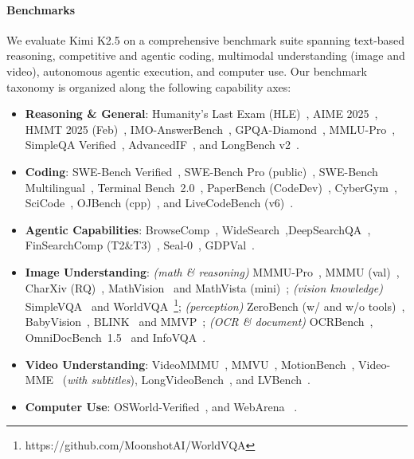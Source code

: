 \paragraph{Benchmarks}
We evaluate Kimi K2.5 on a comprehensive benchmark suite spanning text-based reasoning, competitive and agentic coding, multimodal understanding (image and video), autonomous agentic execution, and computer use. Our benchmark taxonomy is organized along the following capability axes:
\begin{itemize}
\item \textbf{Reasoning \& General}: Humanity's Last Exam (HLE)~\citep{phan2025humanitysexam}, AIME 2025~\citep{aime2025}, HMMT 2025 (Feb)~\citep{hmmt2025feb}, IMO-AnswerBench~\citep{luong-etal-2025-towards}, GPQA-Diamond~\citep{rein2024gpqa}, MMLU-Pro~\citep{wang2024mmluprorobustchallengingmultitask}, SimpleQA Verified~\citep{haas2025simpleqaverifiedreliablefactuality}, AdvancedIF~\citep{he2025advancedifrubricbasedbenchmarkingreinforcement}, and LongBench v2~\citep{bai2025longbenchv2deeperunderstanding}.
\item \textbf{Coding}: 
SWE-Bench Verified~\citep{jimenez2023swe}, 
SWE-Bench Pro (public)~\citep{deng2025swe}, 
SWE-Bench Multilingual~\citep{jimenez2023swe}, 
Terminal Bench~2.0~\citep{merrill2026terminal}, 
PaperBench (CodeDev)~\citep{starace2025paperbench}, 
CyberGym~\citep{wang2025cybergym}, 
SciCode~\citep{tian2024scicode}, 
OJBench (cpp)~\citep{wang2025ojbench}, 
and LiveCodeBench (v6)~\citep{jain2024livecodebench}.
\item \textbf{Agentic Capabilities}: BrowseComp~\cite{wei2025browsecomp}, WideSearch~\cite{wong2025widesearch},DeepSearchQA~\cite{vedula2025deepsearchqa}, FinSearchComp (T2\&T3)~\cite{hu2025finsearchcomp}, Seal-0~\cite{pham2025sealqa}, GDPVal~\cite{patwardhan2025gdpval}.
\item \textbf{Image Understanding}: \textit{(math \& reasoning)} MMMU-Pro~\citep{yue2025mmmupro}, MMMU (val)~\citep{yue2023mmmu}, CharXiv (RQ)~\citep{wang2024charxiv}, MathVision~\citep{wang2024mathvision} and MathVista (mini)~\citep{lu2024mathvista}; \textit{(vision knowledge)} SimpleVQA~\citep{cheng2025simplevqa} and WorldVQA~\footnote{https://github.com/MoonshotAI/WorldVQA}; \textit{(perception)} ZeroBench (w/ and w/o tools)~\citep{roberts2025zerobench}, BabyVision~\citep{chen2026babyvision}, BLINK~\citep{fu2024blinkmultimodallargelanguage} and MMVP~\citep{tong2024eyeswideshutexploring}; \textit{(OCR \& document)} OCRBench~\citep{liu2024ocrbench}, OmniDocBench~1.5~\citep{ouyang2025omnidocbench} and InfoVQA~\citep{mathew2021infovqa}.
\item \textbf{Video Understanding}: VideoMMMU~\citep{hu2025videommmu}, MMVU~\citep{zhao2025mmvu}, MotionBench~\citep{hong2025motionbench}, Video-MME~\citep{fu2025videomme} (\textit{with subtitles}), LongVideoBench~\citep{wu2024longvideobench}, and LVBench~\citep{wang2025lvbench}.
\item \textbf{Computer Use}:  OSWorld-Verified~\cite{osworld_verified, OSWorld}, and WebArena ~\citep{zhou2023webarena}.
\end{itemize}

